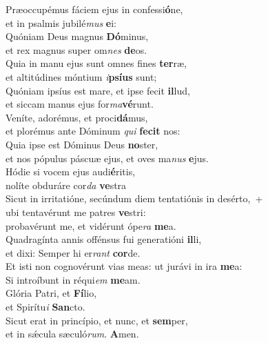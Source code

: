 \evenverse Præoccupémus fáciem ejus in confessi\textbf{ó}ne,~\*\\
\evenverse et in psalmis jubilé\textit{mus} \textbf{e}i:\\
\oddverse Quóniam Deus magnus \textbf{Dó}minus,~\*\\
\oddverse et rex magnus super om\textit{nes} \textbf{de}os.\\
\evenverse Quia in manu ejus sunt omnes fines \textbf{ter}ræ,~\*\\
\evenverse et altitúdines móntium \textit{i}\textbf{psí}\textbf{us} sunt;\\
\oddverse Quóniam ipsíus est mare, et ipse fecit \textbf{il}lud,~\*\\
\oddverse et siccam manus ejus for\textit{ma}\textbf{vé}runt.\\
\evenverse Veníte, adorémus, et proci\textbf{dá}mus,~\*\\
\evenverse et plorémus ante Dóminum \textit{qui} \textbf{fe}\textbf{cit} nos:\\
\oddverse Quia ipse est Dóminus Deus \textbf{no}ster,~\*\\
\oddverse et nos pópulus páscuæ ejus, et oves ma\textit{nus} \textbf{e}jus.\\
\evenverse Hódie si vocem ejus audi\textbf{é}ritis,~\*\\
\evenverse nolíte obduráre cor\textit{da} \textbf{ve}stra\\
\oddverse Sicut in irritatióne, secúndum diem tentatiónis in desérto,~+\\
\oddverse  ubi tentavérunt me patres \textbf{ve}stri:~\*\\
\oddverse probavérunt me, et vidérunt ópe\textit{ra} \textbf{me}a.\\
\evenverse Quadragínta annis offénsus fui generatióni \textbf{il}li,~\*\\
\evenverse et dixi: Semper hi er\textit{rant} \textbf{cor}de.\\
\oddverse Et isti non cognovérunt vias meas: ut jurávi in ira \textbf{me}a:~\*\\
\oddverse Si introíbunt in réqui\textit{em} \textbf{me}am.\\
\evenverse Glória Patri, et \textbf{Fí}lio,~\*\\
\evenverse et Spirítu\textit{i} \textbf{San}cto.\\
\oddverse Sicut erat in princípio, et nunc, et \textbf{sem}per,~\*\\
\oddverse et in sǽcula sæculó\textit{rum}. \textbf{A}men.\\
